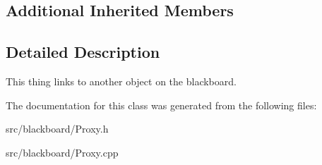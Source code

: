 \subsection*{Additional Inherited Members}


\subsection{Detailed Description}
This thing links to another object on the blackboard. 

The documentation for this class was generated from the following files\+:\begin{DoxyCompactItemize}
\item 
src/blackboard/Proxy.\+h\item 
src/blackboard/Proxy.\+cpp\end{DoxyCompactItemize}
